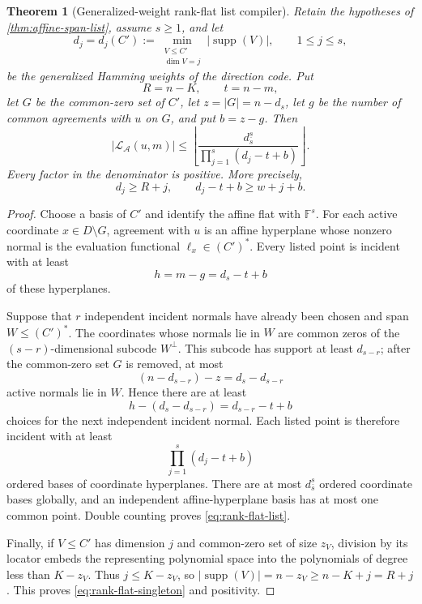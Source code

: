 \documentclass[11pt,a4paper]{amsart}
\numberwithin{equation}{section}
\newtheorem{theorem}{Theorem}[section]
\theoremstyle{remark}
\DeclareMathOperator{\supp}{supp}\DeclareMathOperator{\Fib}{Fib}\DeclareMathOperator{\Sym}{Sym}
\newcommand{\F}{\mathbb F}\newcommand{\B}{\mathbb B}\newcommand{\K}{\mathbb K}\newcommand{\Z}{\mathbb Z}
\begin{document}
\begin{theorem}[Generalized-weight rank-flat list compiler]
\label{thm:rank-flat-list}
Retain the hypotheses of \cref{thm:affine-span-list}, assume \(s\ge1\),
and let
\[
 d_j=d_j(C'):=
 \min_{\substack{V\le C'\\ \dim V=j}}|\supp(V)|,
 \qquad 1\le j\le s,
\]
be the generalized Hamming weights of the direction code.  Put
\[
 R=n-K,\qquad t=n-m,
\]
let \(G\) be the common-zero set of \(C'\), let \(z=|G|=n-d_s\),
let \(g\) be the number of common agreements with \(u\) on \(G\), and
put \(b=z-g\).  Then
\begin{equation}
 |\mathcal L_{\mathcal A}(u,m)|
 \le
 \left\lfloor
 \frac{d_s^{\underline s}}
      {\prod_{j=1}^{s}(d_j-t+b)}
 \right\rfloor .
 \label{eq:rank-flat-list}
\end{equation}
Every factor in the denominator is positive.  More precisely,
\begin{equation}
                    d_j\ge R+j,
 \qquad
                    d_j-t+b\ge w+j+b.
 \label{eq:rank-flat-singleton}
\end{equation}
\end{theorem}

\begin{proof}
Choose a basis of \(C'\) and identify the affine flat with \(\F^s\).
For each active coordinate \(x\in D\setminus G\), agreement with \(u\)
is an affine hyperplane whose nonzero normal is the evaluation functional
\(\ell_x\in(C')^*\).  Every listed point is incident with at least
\[
 h=m-g=d_s-t+b
\]
of these hyperplanes.

Suppose that \(r\) independent incident normals have already been chosen
and span \(W\le(C')^*\).  The coordinates whose normals lie in \(W\) are
common zeros of the \((s-r)\)-dimensional subcode \(W^\perp\).  This
subcode has support at least \(d_{s-r}\); after the common-zero set \(G\)
is removed, at most
\[
 (n-d_{s-r})-z=d_s-d_{s-r}
\]
active normals lie in \(W\).  Hence there are at least
\[
 h-(d_s-d_{s-r})=d_{s-r}-t+b
\]
choices for the next independent incident normal.  Each listed point is
therefore incident with at least
\[
 \prod_{j=1}^{s}(d_j-t+b)
\]
ordered bases of coordinate hyperplanes.  There are at most
\(d_s^{\underline s}\) ordered coordinate bases globally, and an
independent affine-hyperplane basis has at most one common point.  Double
counting proves \eqref{eq:rank-flat-list}.

Finally, if \(V\le C'\) has dimension \(j\) and common-zero set of size
\(z_V\), division by its locator embeds the representing polynomial space
into the polynomials of degree less than \(K-z_V\).  Thus
\(j\le K-z_V\), so \(|\supp(V)|=n-z_V\ge n-K+j=R+j\).  This proves
\eqref{eq:rank-flat-singleton} and positivity.
\end{proof}
\end{document}
